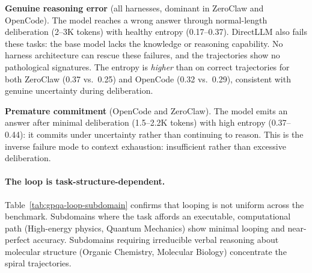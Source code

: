 \textbf{Genuine reasoning error} (all harnesses, dominant in ZeroClaw and
OpenCode).
The model reaches a wrong answer through normal-length deliberation (2--3K
tokens) with healthy entropy (0.17--0.37).
DirectLLM also fails these tasks: the base model lacks the knowledge or
reasoning capability.
No harness architecture can rescue these failures, and the trajectories show
no pathological signatures.
The entropy is \emph{higher} than on correct trajectories for both ZeroClaw
(0.37 vs.\ 0.25) and OpenCode (0.32 vs.\ 0.29), consistent with genuine
uncertainty during deliberation.

\textbf{Premature commitment} (OpenCode and ZeroClaw).
The model emits an answer after minimal deliberation (1.5--2.2K tokens) with
high entropy (0.37--0.44): it commits under uncertainty rather than continuing
to reason.
This is the inverse failure mode to context exhaustion: insufficient rather than
excessive deliberation.

\paragraph{The loop is task-structure-dependent.}

Table~\ref{tab:gpqa-loop-subdomain} confirms that looping is not uniform across
the benchmark.
Subdomains where the task affords an executable, computational path (High-energy
physics, Quantum Mechanics) show minimal looping and near-perfect accuracy.
Subdomains requiring irreducible verbal reasoning about molecular structure
(Organic Chemistry, Molecular Biology) concentrate the spiral trajectories.

